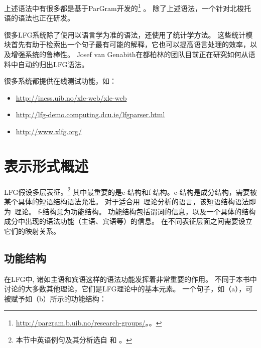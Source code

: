 上述语法中有很多都是基于ParGram开发的\footnote{%
  \url{http://pargram.b.uib.no/research-groups/}。。
} \citep*{BKNS99a-ed,BDKMR02a-u}。 
除了上述语法，一个针对北梭托语的语法也正在研发\citep{Faasz2010a-u}。

很多LFG系统除了使用以语言学为准的语法，还使用了统计学方法。
这些统计模块首先有助于检索出一个句子最有可能的解释，它也可以提高语言处理的效率，以及增强系统的鲁棒性\citep{KRKMVC2004a-u,RKKCMJ2002a-u}。
Josef van Genabith在都柏林的团队目前正在研究如何从语料中自动约归出LFG语法\citep{JGCCR99a-u,DBCGW2005a-u,CBFDRCW2005a-u,CG2006a-u,GWG2007a-u,CBDRGW2008a-u,SvG2009a-u}。

很多系统都提供在线测试功能，如：
\begin{itemize}
\item \url{http://iness.uib.no/xle-web/xle-web}

\item \url{http://lfg-demo.computing.dcu.ie/lfgparser.html}
\item \url{http://www.xlfg.org/}
\end{itemize}

\section{表示形式概述}

\label{Abschnitt-Format-LFG}

LFG假设多层表征。\footnote{%
  本节中英语例句及其分析选自 \citet{Dalrymple2001a-u}和 \citet{Dalrymple2006a}。
}
其中最重要的是c-结构和f-结构。c-结构是成分结构，需要被某个具体的短语结构语法允准。
对于适合用\xbarc~理论分析的语言，该短语结构语法即为\xbarc~理论。
f-结构意为功能结构。
功能结构包括谓词的信息，以及一个具体的结构成分中出现的语法功能（主语、宾语等）的信息。
在不同表征层面之间需要设立它们的映射关系。

\subsection{功能结构}

在LFG中, 诸如主语和宾语这样的语法功能发挥着非常重要的作用。
不同于本书中讨论的大多数其他理论，它们是LFG理论中的基本元素。
一个句子，如（a），可被赋予如（b）所示的功能结构：

\eal
{}
\ex {}
\zl

